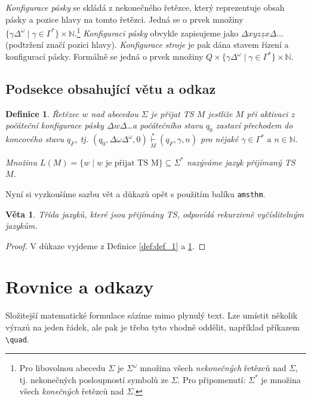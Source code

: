 \documentclass [11pt, a4paper]{article}
\newtheorem{definice}{Definice}
\newtheorem{věta}{Věta}
\begin{document}
\begin{twocolumn}
\emph{Konfigurace pásky} se skládá z nekonečného řetězce,
který reprezentuje obsah pásky a pozice hlavy na tomto
řetězci. Jedná se o prvek množiny $\{\gamma \Delta^\omega \mid \gamma \in \Gamma^*\}\times\mathbb{N}$.\footnote{Pro libovolnou abecedu $\Sigma$ je $\Sigma^\omega$ množina všech \emph{nekonečných} řetězců nad $\Sigma$, tj. nekonečných posloupností symbolů ze $\Sigma$. Pro připomenutí: $\Sigma^*$ je množina všech \emph{konečných} řetězců nad $\Sigma$.} 
\emph{Konfiguraci pásky} obvykle zapisujeme jako $\Delta xyz \underline{z} x\Delta\ldots$ (podtržení značí pozici hlavy). \emph{Konfigurace stroje} je pak
dána stavem řízení a konfigurací pásky. Formálně se jedná o prvek množiny 
$Q\times\{\gamma\Delta^\omega \mid \gamma\in\Gamma^*\} \times\mathbb{N}$.

\subsection{Podsekce obsahující větu a odkaz}
\begin{definice} \label{def:def_2}
\emph{Řetězec} $w$ \emph{nad abecedou $\Sigma$ je přijat TS} $M$ jestliže $M$ při aktivaci z počáteční konfigurace pásky $\underline{\Delta} w\Delta$\ldots a počátečního stavu $q_0$ zastaví přechodem do koncového stavu $q_F$, tj. $(q_0,\Delta\omega\Delta^\omega,0)\underset{M}{\overset{*}{\vdash}} (q_F,\gamma, n)$ pro nějaké $\gamma\in\Gamma^* \text{ a } n\in\mathbb{N}$.

Množinu $L(M) = \{w\mid w \text{  je přijat TS M}\}\subseteq\Sigma^*$ nazýváme \emph{jazyk přijímaný TS} $M$.
\end{definice}

Nyní si vyzkoušíme sazbu vět a důkazů opět s použitím
balíku \texttt{amsthm}.

\begin{věta}
Třída jazyků, které jsou přijímány TS, odpovídá \emph{rekurzivně vyčíslitelným jazykům.}
\end{věta}

\begin{proof} 
V důkaze vyjdeme z Definice \ref{def:def_1} a \ref{def:def_2}.
\end{proof}

\section{Rovnice a odkazy}
Složitejší matematické formulace sázíme mimo plynulý
text. Lze umístit několik výrazů na jeden řádek, ale pak je třeba tyto vhodně oddělit, například příkazem \texttt{\textbackslash quad}.


\end{twocolumn}
\end{document}
